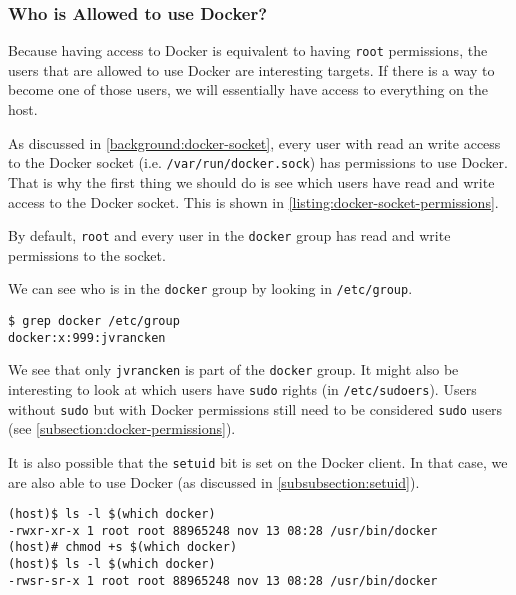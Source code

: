 \subsubsection{Who is Allowed to use Docker?}\label{subsubsection:docker-permissions-host}
Because having access to Docker is equivalent to having \lstinline{root} permissions, the users that are allowed to use Docker are interesting targets. If there is a way to become one of those users, we will essentially have access to everything on the host.

As discussed in \autoref{background:docker-socket}, every user with read an write access to the Docker socket (i.e. \lstinline{/var/run/docker.sock}) has permissions to use Docker. That is why the first thing we should do is see which users have read and write access to the Docker socket. This is shown in \autoref{listing:docker-socket-permissions}.

By default, \lstinline{root} and every user in the \lstinline{docker} group has read and write permissions to the socket.

\medskip

We can see who is in the \lstinline{docker} group by looking in \lstinline{/etc/group}.
\begin{lstlisting}[caption={See what users are in the \lstinline{docker} group.},captionpos=b]
$ grep docker /etc/group
docker:x:999:jvrancken
\end{lstlisting}
We see that only \lstinline{jvrancken} is part of the \lstinline{docker} group. It might also be interesting to look at which users have \lstinline{sudo} rights (in \lstinline{/etc/sudoers}). Users without \lstinline{sudo} but with Docker permissions still need to be considered \lstinline{sudo} users (see \autoref{subsection:docker-permissions}).

\medskip

It is also possible that the \lstinline{setuid} bit is set on the Docker client. In that case, we are also able to use Docker (as discussed in \autoref{subsubsection:setuid}).
\begin{lstlisting}[caption={Permissions without and with the \lstinline{setuid} bit.},captionpos=b]
(host)$ ls -l $(which docker)
-rwxr-xr-x 1 root root 88965248 nov 13 08:28 /usr/bin/docker
(host)# chmod +s $(which docker)
(host)$ ls -l $(which docker)
-rwsr-sr-x 1 root root 88965248 nov 13 08:28 /usr/bin/docker
\end{lstlisting}

